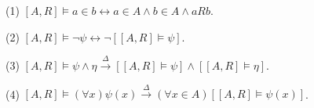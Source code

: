 (1) $[A, R] \models a \in b \leftrightarrow a \in A \wedge b \in A \wedge a R b$.

(2) $[A, R] \models \neg \psi \leftrightarrow \neg [[A, R] \models \psi]$.

(3) $[A, R] \models \psi \wedge \eta \overset{\Delta}{\rightarrow} [[A, R] \models \psi] \wedge [[A, R] \models \eta]$.

(4) $[A, R] \models (\forall x) \psi(x) \overset{\Delta}{\rightarrow} (\forall x \in A) [[A, R] \models \psi(x)]$.
